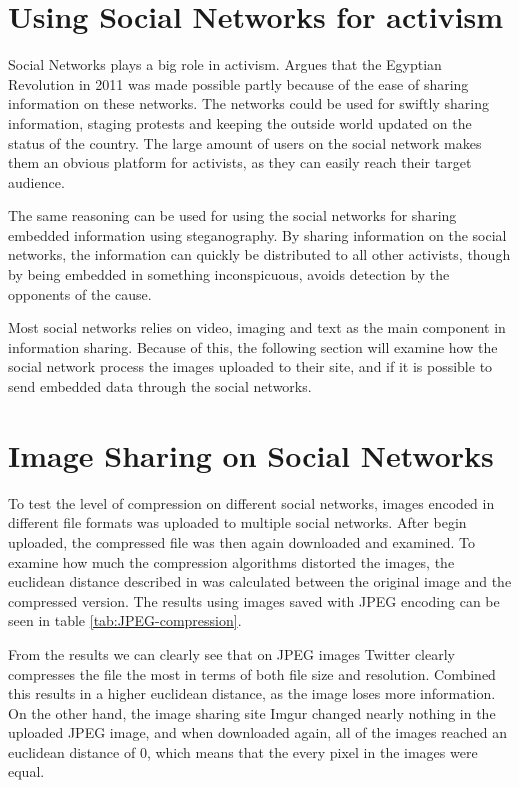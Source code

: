 \clearpage
\section{Using Social Networks for activism}
Social Networks plays a big role in activism. 
\citep{IJoC1242} Argues that the Egyptian Revolution in 2011 was made possible partly because of the ease of sharing information on these networks. 
The networks could be used for swiftly sharing information, staging protests and keeping the outside world updated on the status of the country.
The large amount of users on the social network makes them an obvious platform for activists, as they can easily reach their target audience. 

The same reasoning can be used for using the social networks for sharing embedded information using steganography. 
By sharing information on the social networks, the information can quickly be distributed to all other activists, though by being embedded in something inconspicuous, avoids detection by the opponents of the cause.

Most social networks relies on video, imaging and text as the main component in information sharing.
Because of this, the following section will examine how the social network process the images uploaded to their site, and if it is possible to send embedded data through the social networks.

\section{Image Sharing on Social Networks}

To test the level of compression on different social networks, images encoded in different file formats was uploaded to multiple social networks. 
After begin uploaded, the compressed file was then again downloaded and examined.
To examine how much the compression algorithms distorted the images, the euclidean distance described in \citep{Wang2005} was calculated between the original image and the compressed version.
The results using images saved with JPEG encoding can be seen in table \ref{tab:JPEG-compression}. 

From the results we can clearly see that on JPEG images Twitter clearly compresses the file the most in terms of both file size and resolution.
Combined this results in a higher euclidean distance, as the image loses more information. 
On the other hand, the image sharing site Imgur changed nearly nothing in the uploaded JPEG image, and when downloaded again, all of the images reached an euclidean distance of 0, which means that the every pixel in the images were equal.

